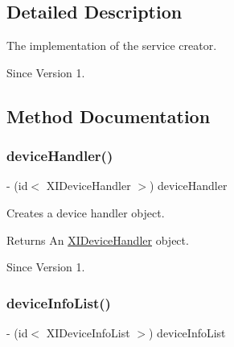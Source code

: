 \subsection{Detailed Description}
The implementation of the service creator. 

\begin{DoxySince}{Since}
Version 1. 
\end{DoxySince}


\subsection{Method Documentation}
\hypertarget{interface_x_i_session_services_internal_a2873e657d72e56d7d0f0b5e0f0e6e241}{}\label{interface_x_i_session_services_internal_a2873e657d72e56d7d0f0b5e0f0e6e241} 
\subsubsection{\texorpdfstring{device\+Handler()}{deviceHandler()}}
{\footnotesize\ttfamily -\/ (id$<$ X\+I\+Device\+Handler $>$) device\+Handler \begin{DoxyParamCaption}{ }\end{DoxyParamCaption}}



Creates a device handler object. 

\begin{DoxyReturn}{Returns}
An \hyperlink{class_x_i_device_handler-p}{X\+I\+Device\+Handler} object. 
\end{DoxyReturn}
\begin{DoxySince}{Since}
Version 1. 
\end{DoxySince}
\hypertarget{interface_x_i_session_services_internal_a9189da286adb396ae6bf4adce6d76291}{}\label{interface_x_i_session_services_internal_a9189da286adb396ae6bf4adce6d76291} 
\subsubsection{\texorpdfstring{device\+Info\+List()}{deviceInfoList()}}
{\footnotesize\ttfamily -\/ (id$<$ X\+I\+Device\+Info\+List $>$) device\+Info\+List \begin{DoxyParamCaption}{ }\end{DoxyParamCaption}}



